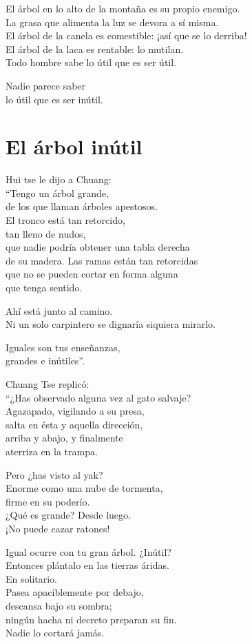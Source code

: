 \documentclass[book,b5paper,hidelinks,final]{memoir}
\begin{document}
	El árbol en lo alto de la montaña es su propio enemigo.\\
	La grasa que alimenta la luz se devora a sí misma.\\
	El árbol de la canela es comestible: ¡así que se lo derriba!\\
	El árbol de la laca es rentable: lo mutilan.\\
	Todo hombre sabe lo útil que es ser útil.
	
	Nadie parece saber\\
	lo útil que es ser inútil.
	
	\chapter*{El árbol inútil}
	
	Hui tse le dijo a Chuang:\\
	``Tengo un árbol grande,\\
	de los que llaman árboles apestosos.\\
	El tronco está tan retorcido,\\
	tan lleno de nudos,\\
	que nadie podría obtener una tabla derecha\\
	de su madera. Las ramas están tan retorcidas\\
	que no se pueden cortar en forma alguna\\
	que tenga sentido.
	
	Ahí está junto al camino.\\
	Ni un solo carpintero se dignaría siquiera mirarlo.
	
	Iguales son tus enseñanzas,\\
	grandes e inútiles''.
	
	Chuang Tse replicó:\\
	``¿Has observado alguna vez al gato salvaje?\\
	Agazapado, vigilando a su presa,\\
	salta en ésta y aquella dirección,\\
	arriba y abajo, y finalmente\\
	aterriza en la trampa.
	
	Pero ¿has visto al yak?\\
	Enorme como una nube de tormenta,\\
	firme en su poderío.\\
	¿Qué es grande? Desde luego.\\
	¡No puede cazar ratones!
	
	Igual ocurre con tu gran árbol. ¿Inútil?\\
	Entonces plántalo en las tierras áridas.\\
	En solitario.\\
	Pasea apaciblemente por debajo,\\
	descansa bajo su sombra;\\
	ningún hacha ni decreto preparan su fin.\\
	Nadie lo cortará jamás.
	
\end{document}
